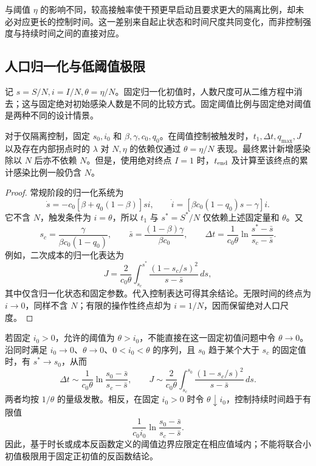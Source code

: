 与阈值 $\eta$ 的影响不同，较高接触率使干预更早启动且要求更大的隔离比例，却未必对应更长的控制时间。这一差别来自起止状态和时间尺度共同变化，而非控制强度与持续时间之间的直接对应。

\subsection{人口归一化与低阈值极限}
\label{sec:scaling-theory}
记 $s=S/N,i=I/N,\theta=\eta/N$。固定归一化初值时，人数尺度可从二维方程中消去；这与固定绝对初始感染人数是不同的比较方式。固定阈值比例与固定绝对阈值是两种不同的设计情景。
\begin{proposition}
\label{prop:scaling}
对于仅隔离控制，固定 $s_0,i_0$ 和 $\beta,\gamma,c_0,q_0$。在阈值控制被触发时，$t_1,\Delta t,q_{\max},J$ 以及存在内部拐点时的 $\lambda$ 对 $N,\eta$ 的依赖仅通过 $\theta=\eta/N$ 表现。最终累计新增感染除以 $N$ 后亦不依赖 $N$。但是，使用绝对终点 $I=1$ 时，$t_{\rm end}$ 及计算至该终点的累计感染比例一般仍含 $N$。
\end{proposition}
\begin{proof}
常规阶段的归一化系统为
\[
\dot s=-c_0[\beta+q_0(1-\beta)]si,\qquad
\dot i=[\beta c_0(1-q_0)s-\gamma]i.
\]
它不含 $N$，触发条件为 $i=\theta$，所以 $t_1$ 与 $s^*=S^*/N$ 仅依赖上述固定量和 $\theta$。又
\[
s_c=\frac{\gamma}{\beta c_0(1-q_0)},\qquad
\bar s=\frac{(1-\beta)\gamma}{\beta c_0},\qquad
\Delta t=\frac1{c_0\theta}\ln\frac{s^*-\bar s}{s_c-\bar s}.
\]
例如，二次成本的归一化表达为
\begin{equation}
J=\frac{2}{c_0\theta}\int_{s_c}^{s^*}
\frac{(1-s_c/s)^2}{s-\bar s}\,ds,
\label{eq:dom:Jtheta}
\end{equation}
其中仅含归一化状态和固定参数。代入控制表达可得其余结论。无限时间的终点为 $i\to0$，同样不含 $N$；有限的操作性终点却为 $i=1/N$，因而保留绝对人口尺度。
\end{proof}

若固定 $i_0>0$，允许的阈值为 $\theta>i_0$，不能直接在这一固定初值问题中令 $\theta\to0$。沿同时满足 $i_0\to0$、$\theta\to0$、$0<i_0<\theta$ 的序列，且 $s_0$ 趋于某个大于 $s_c$ 的固定值时，有 $s^*\to s_0$，从而
\begin{equation}
\Delta t\sim\frac1{c_0\theta}\ln\frac{s_0-\bar s}{s_c-\bar s},\qquad
J\sim\frac2{c_0\theta}\int_{s_c}^{s_0}\frac{(1-s_c/s)^2}{s-\bar s}\,ds.
\label{eq:small-threshold}
\end{equation}
两者均按 $1/\theta$ 的量级发散。相反，在固定 $i_0>0$ 时令 $\theta\downarrow i_0$，控制持续时间趋于有限值
\[
\frac1{c_0i_0}\ln\frac{s_0-\bar s}{s_c-\bar s}.
\]
因此，基于时长或成本反函数定义的阈值边界应限定在相应值域内；不能将联合小初值极限用于固定正初值的反函数结论。


